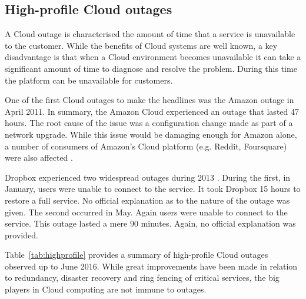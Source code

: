 \documentclass[5p]{elsarticle}
\begin{document}
\subsection{High-profile Cloud outages}
A Cloud outage is characterised the amount of time that a service is unavailable to the customer. While the benefits of Cloud systems are well known, a key disadvantage is that when a Cloud environment becomes unavailable it can take a significant amount of time to diagnose and resolve the problem. During this time the platform can be unavailable for customers.

One of the first Cloud outages to make the headlines was the Amazon outage in April 2011. In summary, the Amazon Cloud experienced an outage that lasted 47 hours. The root cause of the issue was a configuration change made as part of a network upgrade. While this issue would be damaging enough for Amazon alone, a number of consumers of Amazon's Cloud platform (e.g. Reddit, Foursquare) were also affected \cite{InfoWorld2015outage}. 

Dropbox experienced two widespread outages during 2013 \cite{Talbot013DBoutage, Etherington2013DBoutage}. During the first, in January, users were unable to connect to the service. It took Dropbox 15 hours to restore a full service. No official explanation as to the nature of the outage was given. The second occurred in May. Again users were unable to connect to the service. This outage lasted a mere 90 minutes. Again, no official explanation was provided.

Table~\ref{tab:highprofile} provides a summary of high-profile Cloud outages observed up to June 2016\cite{CRN2016outage}. While great improvements have been made in relation to redundancy, disaster recovery and ring fencing of critical services, the big players in Cloud computing are not immune to outages.
\end{document}
